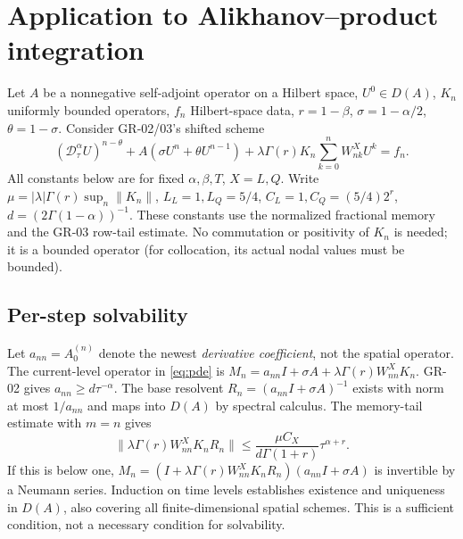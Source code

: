 \documentclass[11pt,a4paper]{article}
\newcommand{\norm}[1]{\lVert#1\rVert}
\begin{document}
\section{Application to Alikhanov--product integration}
Let $A$ be a nonnegative self-adjoint operator on a Hilbert space, $U^0\in D(A)$, $K_n$ uniformly bounded operators, $f_n$ Hilbert-space data, $r=1-\beta$, $\sigma=1-\alpha/2$, $\theta=1-\sigma$. Consider GR-02/03's shifted scheme
\begin{equation}\label{eq:pde}
 (\mathcal D_\tau^\alpha U)^{n-\theta}+A(\sigma U^n+\theta U^{n-1})
 +\lambda\Gamma(r)K_n\sum_{k=0}^nW^X_{nk}U^k=f_n.
\end{equation}
All constants below are for fixed $\alpha,\beta,T$, $X=L,Q$. Write $\mu=|\lambda|\Gamma(r)\sup_n\norm{K_n}$, $L_L=1,L_Q=5/4$, $C_L=1,C_Q=(5/4)2^r$, $d=(2\Gamma(1-\alpha))^{-1}$. These constants use the normalized fractional memory and the GR-03 row-tail estimate. No commutation or positivity of $K_n$ is needed; it is a bounded operator (for collocation, its actual nodal values must be bounded).
\subsection*{Per-step solvability}
Let $a_{nn}=A_0^{(n)}$ denote the newest \emph{derivative coefficient}, not the spatial operator. The current-level operator in \eqref{eq:pde} is $M_n=a_{nn}I+\sigma A+\lambda\Gamma(r)W^X_{nn}K_n$. GR-02 gives $a_{nn}\ge d\tau^{-\alpha}$. The base resolvent $R_n=(a_{nn}I+\sigma A)^{-1}$ exists with norm at most $1/a_{nn}$ and maps into $D(A)$ by spectral calculus. The memory-tail estimate with $m=n$ gives
\[
 \norm{\lambda\Gamma(r)W^X_{nn}K_nR_n}
 \le \frac{\mu C_X}{d\Gamma(1+r)}\tau^{\alpha+r}.
\]
If this is below one, $M_n=(I+\lambda\Gamma(r)W^X_{nn}K_nR_n)(a_{nn}I+\sigma A)$ is invertible by a Neumann series. Induction on time levels establishes existence and uniqueness in $D(A)$, also covering all finite-dimensional spatial schemes. This is a sufficient condition, not a necessary condition for solvability.
\end{document}
